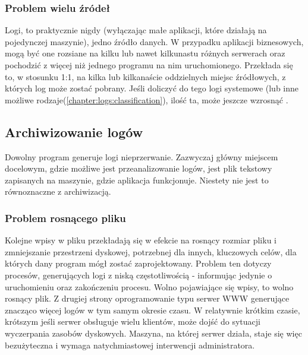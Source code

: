         \subsubsection{Problem wielu źródeł}
        \label{chapter:logs:collecting:multiple_sources}
        Logi, to praktycznie nigdy (wyłączając małe aplikacji, które działają na pojedynczej maszynie),
        jedno źródło danych. W przypadku aplikacji biznesowych, mogą być one rozsiane na kilku lub nawet
        kilkunastu różnych serwerach oraz pochodzić z więcej niż jednego programu na nim uruchomionego.
        Przekłada się to, w stosunku 1:1, na kilka lub kilkanaście oddzielnych miejsc źródłowych, z których
        log może zostać pobrany. Jeśli doliczyć do tego logi systemowe (lub inne możliwe rodzaje(\ref{chapter:logs:classification}),
        ilość ta, może jeszcze wzrosnąć \cite{guide_to_computer_security_log_management}.

    \subsection{Archiwizowanie logów}
    \label{chapter:logs:collecting:archive}
    Dowolny program generuje logi nieprzerwanie. Zazwyczaj główny miejscem docelowym, gdzie możliwe jest
    przeanalizowanie logów, jest plik tekstowy zapisanych na maszynie, gdzie aplikacja funkcjonuje.
    Niestety nie jest to równoznaczne z archiwizacją.

        \subsubsection{Problem rosnącego pliku}
        \label{chapter:logs:collecting:archive:larger_and_larger}
        Kolejne wpisy w pliku przekładają się w efekcie na rosnący rozmiar pliku i zmniejszanie przestrzeni dyskowej,
        potrzebnej dla innych, kluczowych celów, dla których dany program mógł zostać zaprojektowany.
        Problem ten dotyczy procesów, generujących logi z niską częstotliwością - informując jedynie 
        o uruchomieniu oraz zakończeniu procesu. Wolno pojawiające się wpisy, to wolno rosnący plik. 
        Z drugiej strony oprogramowanie typu serwer WWW generujące znacząco więcej logów w tym samym okresie czasu.
        W relatywnie krótkim czasie, krótszym jeśli serwer obsługuje wielu klientów, może dojść do sytuacji wyczerpania zasobów
        dyskowych. Maszyna, na której serwer działa, staje się więc bezużyteczna i wymaga natychmiastowej interwencji
        administratora. 
        
